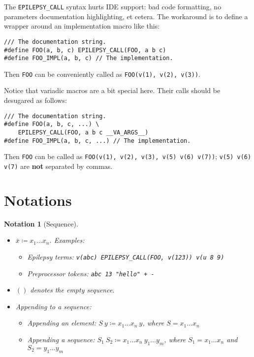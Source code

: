 \documentclass[12pt]{article}
\theoremstyle{break}
\newtheorem{notation}{Notation}
\begin{document}
The \texttt{EPILEPSY\_CALL} syntax hurts IDE support: bad code formatting, no parameters
documentation highlighting, et cetera. The workaround is to define a wrapper around
an implementation macro like this:

\begin{verbatim}
/// The documentation string.
#define FOO(a, b, c) EPILEPSY_CALL(FOO, a b c)
#define FOO_IMPL(a, b, c) // The implementation.
\end{verbatim}

Then \texttt{FOO} can be conveniently called as \texttt{FOO(v(1), v(2), v(3))}.

Notice that variadic macros are a bit special here. Their calls should be desugared as follows:

\begin{verbatim}
/// The documentation string.
#define FOO(a, b, c, ...) \
    EPILEPSY_CALL(FOO, a b c __VA_ARGS__)
#define FOO_IMPL(a, b, c, ...) // The implementation.
\end{verbatim}

Then \texttt{FOO} can be called as \texttt{FOO(v(1), v(2), v(3), v(5) v(6) v(7))};
\texttt{v(5) v(6) v(7)} are \textbf{not} separated by commas.

\section{Notations}

\begin{notation}[Sequence]
    \begin{itemize}
        \item $\overline{x} \coloneqq x_1 \ldots x_n$. Examples:
        \begin{itemize}
            \item Epilepsy terms: \texttt{v(abc) EPILEPSY\_CALL(FOO, v(123)) v(u 8 9)}
            \item Preprocessor tokens: \texttt{abc 13 "hello" + -}
        \end{itemize}
        \item $()$ denotes the empty sequence.
        \item Appending to a sequence:
        \begin{itemize}
            \item Appending an element: $S \ y \coloneqq x_1 \ldots x_n \ y$, where $S = x_1 \ldots x_n$
            \item Appending a sequence: $S_1 \ S_2 \coloneqq x_1 \ldots x_n \ y_1 \ldots y_m$, where $S_1 = x_1 \ldots x_n$
            and $S_2 = y_1 \ldots y_m$
        \end{itemize}
    \end{itemize}
\end{notation}
\end{document}
